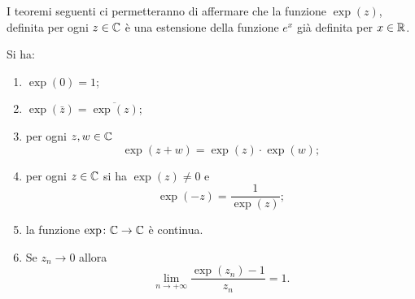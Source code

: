 I teoremi seguenti ci permetteranno di affermare che la funzione $\exp(z)$,
definita
per ogni $z\in {\mathbb C}$ è una
estensione della funzione $e^x$ già definita per $x\in {\mathbb R}$.

\begin{theorem}
\label{th:exp_complesso}%
Si ha:
\begin{enumerate}
\item
$\displaystyle \exp(0) = 1$;

\item
$\displaystyle \exp(\bar z) = \overline{\exp(z)}$;

\item
per ogni $z,w \in {\mathbb C}$
\[
  \exp(z+w) = \exp(z) \cdot \exp(w);
\]

\item
per ogni $z\in {\mathbb C}$ si ha $\exp(z) \neq 0$ e
\[
 \exp(-z) = \frac{1}{\exp(z)};
\]

\item la funzione $\exp\colon {\mathbb C} \to {\mathbb C}$ è continua.

\item Se $z_n\to 0$ allora
\begin{equation}\label{eq:limite_exp_complesso}
   \lim_{n\to +\infty}\frac{\exp(z_n)-1}{z_n} = 1.
\end{equation}
\end{enumerate}
\end{theorem}
%
